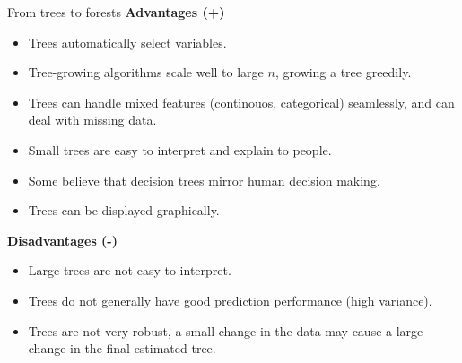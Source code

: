\documentclass[
  10pt,
  ignorenonframetext,
]{beamer}
\providecommand{\tightlist}{%
  \setlength{\itemsep}{0pt}\setlength{\parskip}{0pt}}
\begin{document}
\begin{frame}{From trees to forests}
\protect\hypertarget{from-trees-to-forests}{}
\textbf{Advantages (+)}

\begin{itemize}
\tightlist
\item
  Trees automatically select variables.
\item
  Tree-growing algorithms scale well to large \(n\), growing a tree
  greedily.
\item
  Trees can handle mixed features (continouos, categorical) seamlessly,
  and can deal with missing data.
\item
  Small trees are easy to interpret and explain to people.
\item
  Some believe that decision trees mirror human decision making.
\item
  Trees can be displayed graphically.
\end{itemize}

\textbf{Disadvantages (-)}

\begin{itemize}
\tightlist
\item
  Large trees are not easy to interpret.
\item
  Trees do not generally have good prediction performance (high
  variance).
\item
  Trees are not very robust, a small change in the data may cause a
  large change in the final estimated tree.
\end{itemize}
\end{frame}
\end{document}
